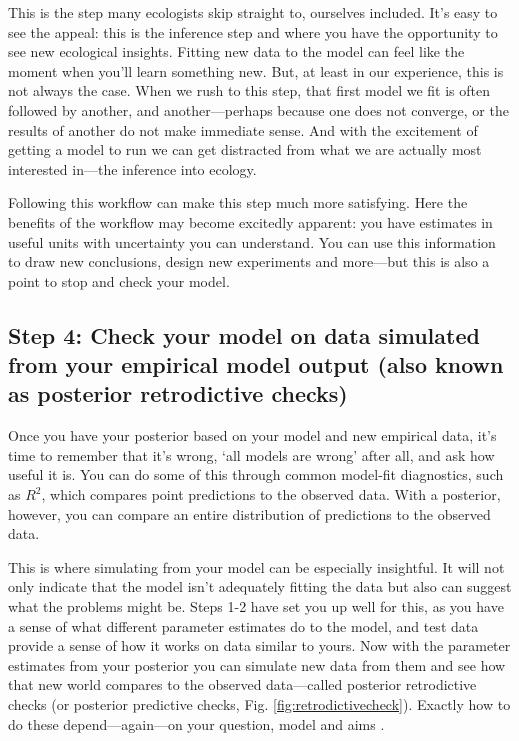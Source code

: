 \documentclass[11pt]{article}
\begin{document}
This is the step many ecologists skip straight to, ourselves included. It's easy to see the appeal: this is the inference step and where you have the opportunity to see new ecological insights. Fitting new data to the model can feel like the moment when you'll learn something new. But, at least in our experience, this is not always the case. When we rush to this step, that first model we fit is often followed by another, and another---perhaps because one does not converge, or the results of another do not make immediate sense. And with the excitement of getting a model to run we can get distracted from what we are actually most interested in---the inference into ecology. %

Following this workflow can make this step much more satisfying. Here the benefits of the workflow may become excitedly apparent: you have estimates in useful units with uncertainty you can understand. You can use this information to draw new conclusions, design new experiments and more---but this is also a point to stop and check your model. 

\subsection*{Step 4: Check your model on data simulated from your empirical model output (also known as posterior retrodictive checks)} 

Once you have your posterior based on your model and new empirical data, it's time to remember that it's wrong, `all models are wrong' after all, and ask how useful it is. You can do some of this through common model-fit diagnostics, such as $R^2$, which compares point predictions to the observed data. With a posterior, however, you can compare an entire distribution of predictions to the observed data. 

This is where simulating from your model can be especially insightful. It will not only indicate that the model isn't adequately fitting the data but also can suggest what the problems might be. Steps 1-2 have set you up well for this, as you have a sense of what different parameter estimates do to the model, and test data provide a sense of how it works on data similar to yours. Now with the parameter estimates from your posterior you can simulate new data from them and see how that new world compares to the observed data---called posterior retrodictive checks (or posterior predictive checks, Fig. \ref{fig:retrodictivecheck}). Exactly how to do these depend---again---on your question, model and aims \citep[see][]{held2010,gelman200ppc,conn2018}. 
\end{document}
